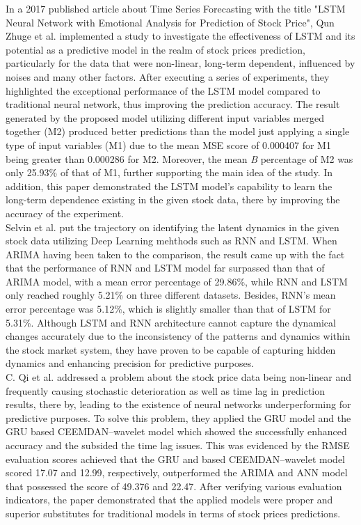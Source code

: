 \documentclass[conference]{IEEEtran}
\begin{document}
In a 2017 published article about Time Series Forecasting with the title "LSTM Neural Network with Emotional Analysis for Prediction of Stock Price", Qun Zhuge et al. \cite{b3} implemented a study to investigate the effectiveness of LSTM and its potential as a predictive model in the realm of stock prices prediction, particularly for the data that were non-linear, long-term dependent, influenced by noises and many other factors. After executing a series of experiments, they highlighted the exceptional performance of the LSTM model compared to traditional neural network, thus improving the prediction accuracy. The result generated by the proposed model utilizing different input variables merged together (M2) produced better predictions than the model just applying a single type of input variables (M1) due to the mean MSE score of 0.000407 for M1 being greater than 0.000286 for M2. Moreover, the mean \textit{B} percentage of M2 was only 25.93\% of that of M1, further supporting the main idea of the study. In addition, this paper demonstrated the LSTM model's capability to learn the long-term dependence existing in the given stock data, there by improving the accuracy of the experiment.\\

Selvin et al. \cite{b4} put the trajectory on identifying the latent dynamics in the given stock data utilizing Deep Learning mehthods such as RNN and LSTM. When ARIMA having been taken to the comparison, the result came up with the fact that the performance of RNN and LSTM model far surpassed than that of ARIMA model, with a mean error percentage of 29.86\%, while RNN and LSTM only reached roughly 5.21\% on three different datasets. Besides, RNN's mean error percentage was 5.12\%, which is slightly smaller than that of LSTM for 5.31\%. Although LSTM and RNN architecture cannot capture the dynamical changes accurately due to the inconsistency of the patterns and dynamics within the stock market system, they have proven to be capable of capturing hidden dynamics and enhancing precision for predictive purposes.\\

C. Qi et al. \cite{b5} addressed a problem about the stock price data being non-linear and frequently causing stochastic deterioration as well as time lag in prediction results, there by, leading to the existence of neural networks underperforming for predictive purposes. To solve this problem, they applied the GRU model and the GRU based CEEMDAN–wavelet model which showed the successfully enhanced accuracy and the subsided the time lag issues. This was evidenced by the RMSE evaluation scores achieved that the GRU and based CEEMDAN–wavelet model scored 17.07 and 12.99, respectively, outperformed the ARIMA and ANN model that possessed the score of 49.376 and 22.47. After verifying various evaluation indicators, the paper demonstrated that the applied models were proper and superior substitutes for traditional models in terms of stock prices predictions.\\
\end{document}
